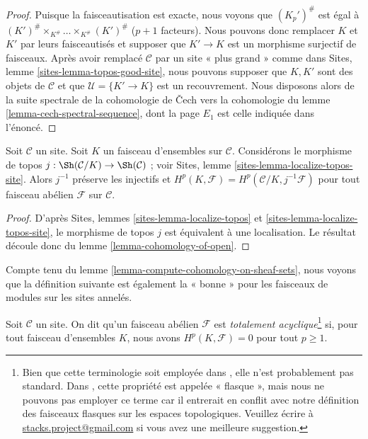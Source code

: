 \begin{proof}
Puisque la faisceautisation est exacte, nous voyons que
$(K_p')^\#$ est égal à
$(K')^\# \times_{K^\#} \ldots \times_{K^\#} (K')^\#$
($p + 1$ facteurs). Nous pouvons donc remplacer $K$ et $K'$ par leurs
faisceautisés et supposer que $K' \to K$ est un morphisme surjectif de
faisceaux. Après avoir remplacé $\mathcal{C}$ par un site « plus grand » comme
dans Sites, lemme \ref{sites-lemma-topos-good-site}, nous pouvons supposer que
$K, K'$ sont des objets de $\mathcal{C}$ et que
$\mathcal{U} = \{K' \to K\}$ est un recouvrement. Nous disposons alors de la
suite spectrale de la cohomologie de {\v C}ech vers la cohomologie du
lemme \ref{lemma-cech-spectral-sequence}, dont la page $E_1$ est celle indiquée
dans l'énoncé.
\end{proof}

\begin{lemma}
\label{lemma-cohomology-on-sheaf-sets}
Soit $\mathcal{C}$ un site. Soit $K$ un faisceau d'ensembles sur
$\mathcal{C}$. Considérons le morphisme de topos
$j : \Sh(\mathcal{C}/K) \to \Sh(\mathcal{C})$ ; voir
Sites, lemme \ref{sites-lemma-localize-topos-site}.
Alors $j^{-1}$ préserve les injectifs et
$H^p(K, \mathcal{F}) = H^p(\mathcal{C}/K, j^{-1}\mathcal{F})$
pour tout faisceau abélien $\mathcal{F}$ sur $\mathcal{C}$.
\end{lemma}

\begin{proof}
D'après Sites, lemmes \ref{sites-lemma-localize-topos} et
\ref{sites-lemma-localize-topos-site}, le morphisme de topos $j$ est équivalent
à une localisation. Le résultat découle donc du
lemme \ref{lemma-cohomology-of-open}.
\end{proof}

\noindent
Compte tenu du lemme \ref{lemma-compute-cohomology-on-sheaf-sets}, nous voyons
que la définition suivante est également la « bonne » pour les faisceaux de
modules sur les sites annelés.

\begin{definition}
\label{definition-limp}
Soit $\mathcal{C}$ un site.
On dit qu'un faisceau abélien $\mathcal{F}$ est
{\it totalement acyclique}\footnote{Bien que cette terminologie soit employée
dans \cite[Vbis, Proposition 1.3.10]{SGA4}, elle n'est probablement pas
standard. Dans \cite[V, Definition 4.1]{SGA4}, cette propriété est appelée
« flasque », mais nous ne pouvons pas employer ce terme car il entrerait en
conflit avec notre définition des faisceaux flasques sur les espaces
topologiques. Veuillez écrire à
\href{mailto:stacks.project@gmail.com}{stacks.project@gmail.com}
si vous avez une meilleure suggestion.} si, pour tout faisceau d'ensembles
$K$, nous avons $H^p(K, \mathcal{F}) = 0$ pour tout $p \geq 1$.
\end{definition}

